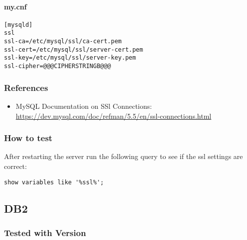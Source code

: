 \paragraph*{my.cnf}
\begin{lstlisting}
[mysqld]
ssl
ssl-ca=/etc/mysql/ssl/ca-cert.pem
ssl-cert=/etc/mysql/ssl/server-cert.pem
ssl-key=/etc/mysql/ssl/server-key.pem
ssl-cipher=@@@CIPHERSTRINGB@@@
\end{lstlisting}





\subsubsection{References}
\begin{itemize}
  \item MySQL Documentation on SSl Connections: \url{https://dev.mysql.com/doc/refman/5.5/en/ssl-connections.html}
\end{itemize}


\subsubsection{How to test}
After restarting the server run the following query to see if the ssl settings are correct:
\begin{lstlisting}
show variables like '%ssl%';
\end{lstlisting}


\subsection{DB2}
\subsubsection{Tested with Version}



